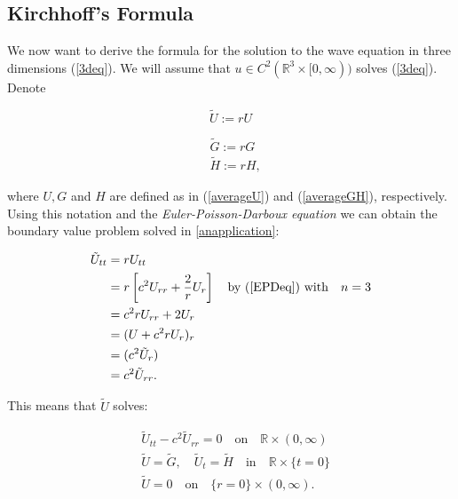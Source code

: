 \documentclass[a4paper, 12pt]{article}
\numberwithin{equation}{section}
\begin{document}
\subsection{Kirchhoff's Formula}
We now want to derive the formula for the solution to the wave equation in three dimensions (\ref{3deq}). We will assume that $u \in C^2(\mathbb{R}^3 \times
[0, \infty))$ solves (\ref{3deq}). Denote 

\begin{equation} \label{Udash}
    \tilde{U}:=rU
\end{equation}

\begin{equation} \label{GHdash}
    \begin{aligned}
        &\tilde{G}:=rG\\
        &\tilde{H}:=rH,    
    \end{aligned}
\end{equation}

where $U,G$ and $H$ are defined as in (\ref{averageU}) and (\ref{averageGH}), respectively. Using this notation and the \emph{Euler-Poisson-Darboux equation} we can
obtain the boundary value problem solved in \ref{anapplication}:

\begin{equation*}
    \begin{aligned}
        \tilde{U}_{tt}&=rU_{tt}\\
        &=r\left[c^2U_{rr}+\frac{2}{r}U_r\right] \quad \textrm{by (\ref{EPDeq}) with} \quad n=3\\
        &=c^2rU_{rr}+2U_r\\
        &=(U+c^2rU_r)_r\\
        &=(c^2\tilde{U}_r)\\
        &=c^2\tilde{U}_{rr}.        
    \end{aligned}
\end{equation*}

This means that $\tilde{U}$ solves:

\begin{equation} \label{tilUwave}
    \begin{aligned}
        &\tilde{U}_{tt}-c^2\tilde{U}_{rr}=0 \quad \textrm{on} \quad \mathbb{R}\times (0,\infty)\\
        &\tilde{U}=\tilde{G}, \quad \tilde{U}_t=\tilde{H} \quad \textrm{in} \quad \mathbb{R}\times\{t=0\}\\
        &\tilde{U}=0 \quad \textrm{on} \quad \{r=0\}\times (0, \infty).
    \end{aligned}
\end{equation}
\end{document}
